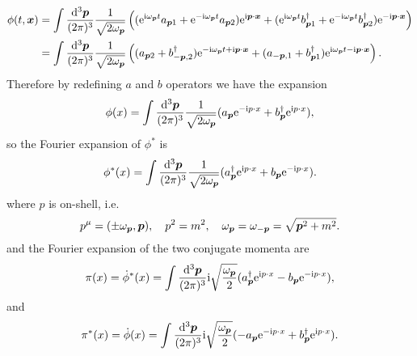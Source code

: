 \documentclass[hyperref, a4paper]{article}
\newcommand*{\ii}{\mathrm{i}}
\newcommand*{\ee}{\mathrm{e}}
\begin{document}
\begin{itemize}
\[\begin{aligned}
            \phi(t, \vb*{x}) &= \int \frac{\dd[3]{\vb*{p}}}{(2\pi)^3} \frac{1}{\sqrt{2 \omega_{\vb*{p}}}} \left(  (\ee^{\ii \omega_{\vb*{p}} t} a_{\vb*{p} 1} + \ee^{- \ii \omega_{\vb*{p}} t} a_{\vb*{p} 2}) \ee^{\ii \vb*{p} \cdot \vb*{x}} + (\ee^{\ii \omega_{\vb*{p}} t} b^\dagger_{\vb*{p} 1} + \ee^{- \ii \omega_{\vb*{p}} t} b^\dagger_{\vb*{p} 2}) \ee^{- \ii \vb*{p} \cdot \vb*{x}} \right) \\
            &= \int \frac{\dd[3]{\vb*{p}}}{(2\pi)^3} \frac{1}{\sqrt{2 \omega_{\vb*{p}}}} \left( (a_{\vb*{p}2} + b^\dagger_{- \vb*{p}, 2}) \ee^{-\ii \omega_{\vb*{p}} t + \ii \vb*{p} \cdot \vb*{x}} + (a_{-\vb*{p} ,1} + b^\dagger_{\vb*{p} 1}) \ee^{\ii \omega_{\vb*{p}} t - \ii \vb*{p} \cdot \vb*{x}} \right).
        \end{aligned}
    \]
    Therefore by redefining $a$ and $b$ operators we have the expansion
    \begin{equation}
        \phi(x) = \int \frac{\dd[3]{\vb*{p}}}{(2\pi)^3} \frac{1}{\sqrt{2 \omega_{\vb*{p}}}} (a_{\vb*{p}} \ee^{- \ii p \cdot x} + b^\dagger_{\vb*{p}} \ee^{\ii p \cdot x}),
    \end{equation} 
    so the Fourier expansion of $\phi^*$ is
    \begin{equation}
        \phi^*(x) = \int \frac{\dd[3]{\vb*{p}}}{(2\pi)^3} \frac{1}{\sqrt{2\omega_{\vb*{p}}}} (a^\dagger_{\vb*{p}} \ee^{\ii p \cdot x} + b_{\vb*{p}} \ee^{- \ii p \cdot x}).
    \end{equation} 
    where $p$ is on-shell, i.e.
    \begin{equation}
        p^\mu = (\pm \omega_{\vb*{p}}, \vb*{p}), \quad p^2 = m^2, \quad \omega_{\vb*{p}} = \omega_{-\vb*{p}}= \sqrt{{\vb*{p}}^2 + m^2}.
    \end{equation}
    and the Fourier expansion of the two conjugate momenta are 
    \begin{equation}
        \pi(x) = \dot{\phi}^*(x) = \int \frac{\dd[3]{\vb*{p}}}{(2\pi)^3} \ii \sqrt{\frac{\omega_{\vb*{p}}}{2}} (a^\dagger_{\vb*{p}} \ee^{\ii p \cdot x} - b_{\vb*{p}} \ee^{- \ii p \cdot x}),
    \end{equation}
    and 
    \begin{equation}
        \pi^*(x) = \dot{\phi}(x) = \int \frac{\dd[3]{\vb*{p}}}{(2\pi)^3} \ii \sqrt{\frac{\omega_{\vb*{p}}}{2}} (- a_{\vb*{p}} \ee^{- \ii p \cdot x} + b^\dagger_{\vb*{p}} \ee^{\ii p \cdot x}).
    \end{equation}


\end{itemize}
\end{document}
